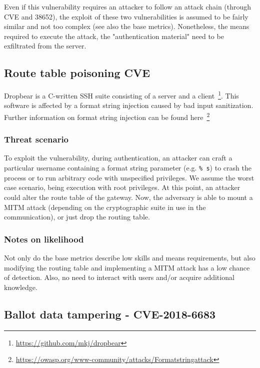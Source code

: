 Even if this vulnerability requires an attacker to follow an attack chain (through CVE and 38652), the exploit of these two vulnerabilities is assumed to be fairly similar and not too complex (see also the base metrics). Nonetheless, the means required to execute the attack, the "authentication material" need to be exfiltrated from the server.

\subsection*{Route table poisoning \- CVE}

Dropbear is a C-written SSH suite consisting of a server and a client~\footnote{\href{https://github.com/mkj/dropbear} {https://github.com/mkj/dropbear}}. This software is affected by a format string injection caused by bad input sanitization. Further information on format string injection can be found here~\footnote{\href{https://owasp.org/www-community/attacks/Format_string_attack} {https://owasp.org/www-community/attacks/Format\textunderscore string\textunderscore attack}}

\subsubsection*{Threat scenario}

To exploit the vulnerability, during authentication, an attacker can craft a particular username containing a format string parameter (e.g. \texttt{\% s}) to crash the process or to run arbitrary code with unspecified privileges. We assume the worst case scenario, being execution with root privileges. At this point, an attacker could alter the route table of the gateway. Now, the adversary is able to mount a MITM attack (depending on the cryptographic suite in use in the communication), or just drop the routing table.

\subsubsection*{Notes on likelihood}

Not only do the base metrics describe low skills and means requirements, but also modifying the routing table and implementing a MITM attack has a low chance of detection. Also, no need to interact with users and/or acquire additional knowledge.

\subsection*{Ballot data tampering - CVE-2018-6683}

